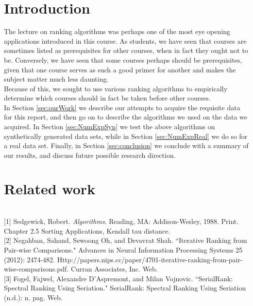 \documentclass[10pt]{siamltex}
\begin{document}
\begin{pagewiselinenumbers}
\section{Introduction}

The lecture on ranking algorithms was perhaps one of the most eye opening applications introduced in this course. As students, we have seen that courses are sometimes listed as prerequisites for other courses, when in fact they ought not to be. Conversely, we have seen that some courses perhaps should be prerequisites, given that one course serves as such a good primer for another and makes the subject matter much less daunting.\\

Because of this, we sought to use various ranking algorithms to empirically determine which courses should in fact be taken before other courses.\\

In Section \ref{sec:ourWork} we describe our attempts to acquire the requisite data for this report, and then go on to describe the algorithms we used on the data we acquired. In Section  \ref{sec:NumExpSyn} we test the above algorithms on synthetically generated data sets, while in Section \ref{sec:NumExpReal} we do so for a real data set. Finally, in Section  \ref{sec:conclusion} we conclude with a summary of our results, and discuss future possible research direction. 

\section{Related work} \label{sec:relWork}\textcolor{white}{.}\\

[1] Sedgewick, Robert. \textit{Algorithms}. Reading, MA: Addison-Wesley, 1988. Print. Chapter 2.5 Sorting Applications, Kendall tau distance.\\

[2] Negahban, Sahand, Sewoong Oh, and Devavrat Shah. ``Iterative Ranking from Pair-wise Comparisons." Advances in Neural Information Processing Systems 25 (2012): 2474-482. Http://papers.nips.cc/paper/4701-iterative-ranking-from-pair-wise-comparisons.pdf. Curran Associates, Inc. Web.\\

[3] Fogel, Fajwel, Alexandre D'Aspremont, and Milan Vojnovic. ``SerialRank: Spectral Ranking Using Seriation." SerialRank: Spectral Ranking Using Seriation (n.d.): n. pag. Web.


\end{pagewiselinenumbers}
\end{document}
